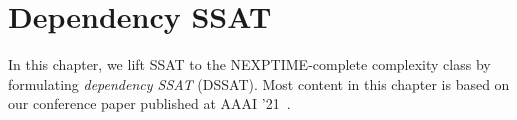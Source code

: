 \chapter{Dependency SSAT}
\label{chap:dependency-ssat}

In this chapter, we lift SSAT to the NEXPTIME-complete complexity class by formulating \textit{dependency SSAT} (DSSAT).
Most content in this chapter is based on our conference paper published at AAAI '21~\cite{LeeAAAI21DSSAT}.



